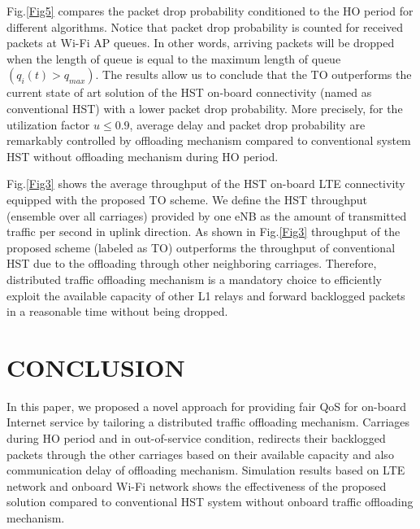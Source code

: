 \documentclass[journal]{IEEEtran}
\begin{document}
{Fig.\ref{Fig5} compares the packet drop probability conditioned to the HO period for different algorithms. Notice that packet drop probability is counted for received packets at Wi-Fi AP queues. In other words, arriving packets will be dropped when the length of queue is equal to the maximum length of queue $(q_{i} (t)> q_{max})$. The results allow us to conclude that the TO outperforms the current state of art solution of the HST on-board connectivity (named as conventional HST) with a lower packet drop probability. More precisely, for the utilization factor $u\leq0.9$, average delay and packet drop probability are remarkably controlled by offloading mechanism compared to conventional system HST without offloading mechanism during HO period. 


Fig.\ref{Fig3} shows the average throughput of the HST on-board LTE connectivity equipped with the proposed TO scheme. We define the HST throughput (ensemble over all carriages) provided by one eNB as the amount of transmitted traffic per second in uplink direction. As shown in Fig.\ref{Fig3} throughput of the proposed scheme (labeled as TO) outperforms the throughput of conventional HST due to the offloading through other neighboring carriages. Therefore, distributed traffic offloading mechanism is a mandatory choice to efficiently exploit the available capacity of other L1 relays and forward backlogged packets in a reasonable time without being dropped.



\section{CONCLUSION}
\label{sec5}
In this paper, we proposed a novel approach for providing fair QoS for on-board Internet service by tailoring a distributed traffic offloading mechanism.  Carriages during HO period and in out-of-service condition, redirects their backlogged packets through the other carriages based on their available capacity and also communication delay of offloading mechanism. Simulation results based on LTE network and onboard Wi-Fi network shows the effectiveness of the proposed solution compared to conventional HST system without onboard traffic offloading mechanism.





}
\end{document}
